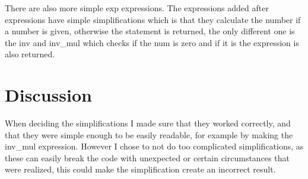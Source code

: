 \documentclass[a4paper,11pt]{article}
\begin{document}
There are also more simple exp expressions. The expressions added after expressions have simple simplifications which is that they calculate the number if a number is given, otherwise the statement is returned, the only different one is the inv and inv\_mul which checks if the num is zero and if it is the expression is also returned.
\section*{Discussion}
When deciding the simplifications I made sure that they worked correctly, and that they were simple enough to be easily readable, for example by making the inv\_mul expression. However I chose to not do too complicated simplifications, as these can easily break the code with unexpected or certain circumstances that were realized, this could make the simplification create an incorrect result.
\end{document}

